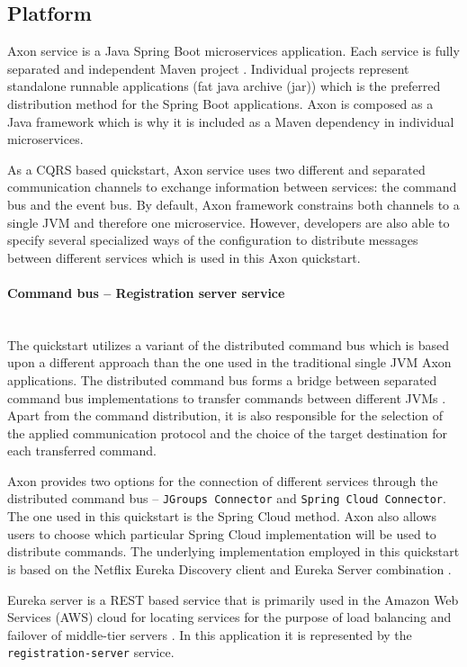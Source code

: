 \documentclass[oneside,
  digital, %
  table,   %
  lof,     %
  lot,     %
]{fithesis3}
\newcommand{\newlinepar}[1]{\paragraph{#1}\needspace{4\baselineskip}\mbox{}\\}
\begin{document}
\subsection{Platform}

Axon service is a Java Spring Boot \cite{spring_boot} microservices application. Each service is fully separated and independent Maven  project \cite{maven}. Individual projects represent standalone runnable applications (fat java archive (jar)) which is the preferred distribution method for the Spring Boot applications. Axon is composed as a Java framework which is why it is included as a Maven dependency in individual microservices.

As a CQRS based quickstart, Axon service uses two different and separated communication channels to exchange information between services: the command bus and the event bus. By default, Axon framework constrains both channels to a single JVM and therefore one microservice. However, developers are also able to specify several specialized ways of the configuration to distribute messages between different services which is used in this Axon quickstart.

\newlinepar{Command bus -- Registration server service}

The quickstart utilizes a variant of the distributed command bus which is based upon a different approach than the one used in the traditional single JVM Axon applications. The distributed command bus forms a bridge between separated command bus implementations to transfer commands between different JVMs \cite{axon_framework_reference_guide}. Apart from the command distribution, it is also responsible for the selection of the applied communication protocol and the choice of the target destination for each transferred command. 

Axon provides two options for the connection of different services through the distributed command bus -- \texttt{JGroups Connector} and \texttt{Spring Cloud Connector}. The one used in this quickstart is the Spring Cloud \cite{spring_cloud} method. Axon also allows users to choose which particular Spring Cloud implementation will be used to distribute commands. The underlying implementation employed in this quickstart is based on the Netflix Eureka Discovery client and Eureka Server combination \cite{service_registration}. 

Eureka server is a REST based service that is primarily used in the Amazon Web Services (AWS) cloud for locating services for the purpose of load balancing and failover of middle-tier servers \cite{eureka}. In this application it is represented by the \texttt{registration-server} service.
\end{document}
